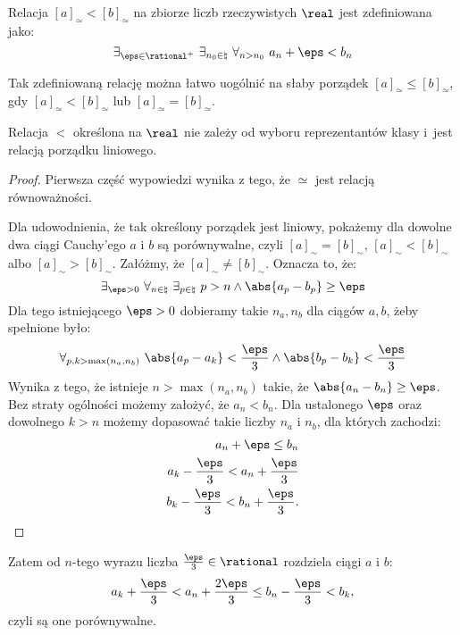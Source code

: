 \begin{definition}
    Relacja \( [a]_{\simeq} < [b]_{\simeq} \) na zbiorze liczb rzeczywistych \( \real \) jest zdefiniowana jako:
    \[
        \exists_{\eps \in \rational^{+}} \ \exists_{n_0 \in \natural} \ \forall_{n > n_0} \ a_n + \eps < b_n
    \]
\end{definition}
Tak zdefiniowaną relację można łatwo uogólnić na słaby porządek \( [a]_{\simeq} \leq [b]_{\simeq} \), gdy \( [a]_{\simeq} < [b]_{\simeq} \) lub \( [a]_{\simeq} = [b]_{\simeq} \).

\begin{theorem}
    Relacja \( < \) określona na \( \real \) nie zależy od wyboru reprezentantów klasy i~jest relacją porządku liniowego.
\end{theorem}
\begin{proof}
    Pierwsza część wypowiedzi wynika z tego, że \( \simeq \) jest relacją równoważności.

    Dla udowodnienia, że tak określony porządek jest liniowy, pokażemy dla dowolne dwa ciągi Cauchy'ego \( a \) i \( b \) są porównywalne, czyli
    \( [a]_{\sim} = [b]_{\sim} \), \( [a]_{\sim} < [b]_{\sim} \) albo \( [a]_{\sim} > [b]_{\sim} \).
    Załóżmy, że \( [a]_{\sim} \ne [b]_{\sim} \). Oznacza to, że:
    \[
        \exists_{\eps > 0} \ \forall_{n \in \natural} \ \exists_{p \in \natural} \ p > n \land \abs{a_p - b_p} \geq \eps
    \]
    Dla tego istniejącego \( \eps > 0 \) dobieramy takie \( n_a, n_b \) dla ciągów \( a, b \), żeby spełnione było:
    \[
        \forall_{p, k > \max(n_a, n_b)} \ \abs{a_p - a_k} < \frac{\eps}{3} \land \abs{b_p - b_k} < \frac{\eps}{3}
    \]
    Wynika z tego, że istnieje \( n > \max(n_a, n_b) \) takie, że \( \abs{a_n - b_n} \geq \eps \). Bez straty ogólności możemy założyć, że \( a_n < b_n \).
    Dla ustalonego \( \eps \) oraz dowolnego \( k > n \) możemy dopasować takie liczby \( n_a \) i \( n_b \), dla których zachodzi:
    \begin{align}
        a_n + \eps \leq b_n \\
        a_k - \frac{\eps}{3} < a_n + \frac{\eps}{3} \\
        b_k - \frac{\eps}{3} < b_n + \frac{\eps}{3}.
    \end{align}
\end{proof}
Zatem od \( n \)-tego wyrazu liczba \( \frac{\eps}{3} \in \rational \) rozdziela ciągi \( a \) i  \( b \):
\[
    a_k + \frac{\eps}{3} < a_n + \frac{2\eps}{3} \leq b_n - \frac{\eps}{3} < b_k,
\]
czyli są one porównywalne.